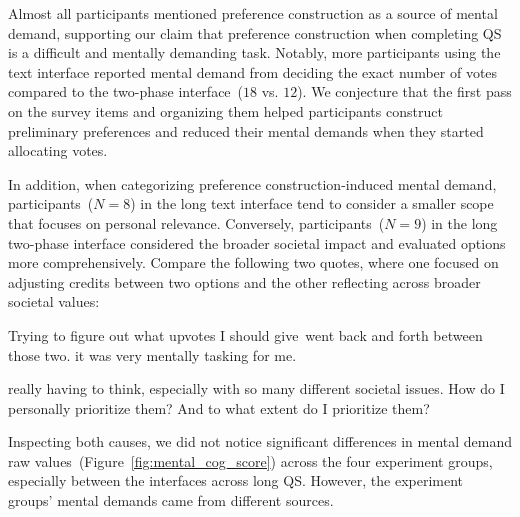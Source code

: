 Almost all participants mentioned preference construction as a source of mental demand, supporting our claim that preference construction when completing QS is a difficult and mentally demanding task. Notably, more participants using the text interface reported mental demand from deciding the exact number of votes compared to the two-phase interface~($18$ vs. $12$). We conjecture that the first pass on the survey items and organizing them helped participants construct preliminary preferences and reduced their mental demands when they started allocating votes.

In addition, when categorizing preference construction-induced mental demand, participants~($N=8$) in the long text interface tend to consider a smaller scope that focuses on personal relevance. Conversely, participants~($N=9$) in the long two-phase interface considered the broader societal impact and evaluated options more comprehensively. Compare the following two quotes, where one focused on adjusting credits between two options and the other reflecting across broader societal values:

\begin{displayquote}
Trying to figure out what upvotes I should give~\bracketellipsis went back and forth between those two. \bracketellipsis it was very mentally tasking for me. \hfill{}
\end{displayquote}

\begin{displayquote}
\bracketellipsis really having to think, especially with so many different societal issues. How do I personally prioritize them? And to what extent do I prioritize them? \hfill{}
\end{displayquote}

Inspecting both causes, we did not notice significant differences in mental demand raw values~(Figure~\ref{fig:mental_cog_score}) across the four experiment groups, especially between the interfaces across long QS. However, the experiment groups' mental demands came from different sources.


